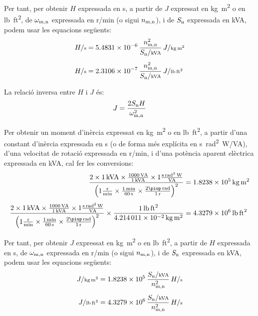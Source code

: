 Per tant, per  obtenir $H$ expressada en \unit{s}, a partir de $J$  expressat en \unit{kg.m^2} o en \unit{lb.ft^2}, de $\omega_\mathrm{m,n}$ expressada en \unit{r/min} (o sigui $n_\mathrm{m,n}$), i de $S_\mathrm{n}$ expressada en \unit{kVA}, podem usar les equacions següents:
\begin{subequations}
\begin{align}
    H/{\scriptstyle \unit{s}} &= \num{5,4831e-6}\,  \frac{n\ped{m,n}^2}{S\ped{n}/{\scriptstyle \unit{kVA}}} \, J/{\scriptstyle \unit{kg.m^2}} \\[1ex]
    H/{\scriptstyle \unit{s}} &= \num{2,3106e-7}\,  \frac{n\ped{m,n}^2}{S\ped{n}/{\scriptstyle \unit{kVA}}} \, J/{\scriptstyle \unit{lb.ft^2}}
\end{align}
\end{subequations}

La relació inversa entre $H$ i $J$ és:
\begin{equation}
    J = \frac{2 S_\mathrm{n} H}{\omega_\mathrm{m,n}^2}
\end{equation}

Per  obtenir un moment d'inèrcia expressat en \unit{kg.m^2} o en \unit{lb.ft^2}, a partir d'una constant d'inèrcia  expressada en \unit{s} (o de forma més explícita en \unit{s.rad^2.W/VA}), d'una velocitat de rotació expressada en \unit{r/min}, i d'una potència aparent elèctrica expressada en \unit{kVA}, cal  fer les conversions:
\begin{subequations}
\begin{align}
    \frac{2\times \qty{1}{kVA} \times \frac{\qty{1000}{VA}}{\qty{1}{kVA}} \times 1 \frac{\unit{s.rad^2.W}}{\unit{VA}}}{\left(1\frac{\unit{r}}{\unit{min}} \times \frac{\qty{1}{min}}{\qty{60}{s}} \times \frac{2\piup\,\unit{rad}}{\qty{1}{r}}\right)^2}  &= \qty{1,8238e5}{kg.m^2} \\[1ex]
    \frac{2\times \qty{1}{kVA} \times \frac{\qty{1000}{VA}}{\qty{1}{kVA}} \times 1 \frac{\unit{s.rad^2.W}}{\unit{VA}}}{\left(1\frac{\unit{r}}{\unit{min}} \times \frac{\qty{1}{min}}{\qty{60}{s}} \times \frac{2\piup\,\unit{rad}}{\qty{1}{r}}\right)^2}  \times \frac{\qty{1}{lb.ft^2}}{\qty{4,214011e-2}{kg.m^2}} &= \qty{4,3279e6}{lb.ft^2}
\end{align}
\end{subequations}

Per tant, per  obtenir $J$  expressat en \unit{kg.m^2} o en \unit{lb.ft^2}, a partir de $H$ expressada en \unit{s}, de $\omega_\mathrm{m,n}$ expressada en \unit{r/min} (o sigui $n_\mathrm{m,n}$), i de $S_\mathrm{n}$ expressada en \unit{kVA}, podem usar les equacions següents:
\begin{subequations}
\begin{align}
     J/{\scriptstyle \unit{kg.m^2}} &= \num{1,8238e5}\,  \frac{S\ped{n}/{\scriptstyle \unit{kVA}}}{n\ped{m,n}^2} \, H/{\scriptstyle \unit{s}}\\[1ex]
    J/{\scriptstyle \unit{lb.ft^2}} &= \num{4,3279e6}\,  \frac{S\ped{n}/{\scriptstyle \unit{kVA}}}{n\ped{m,n}^2} \, H/{\scriptstyle \unit{s}}
\end{align}
\end{subequations}

